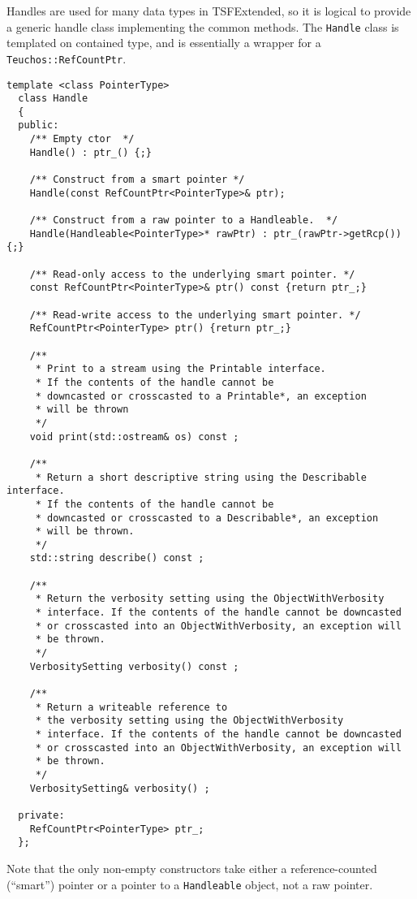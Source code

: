 Handles are used for many data types in TSFExtended, so it is logical to
provide a generic handle class implementing the common methods. The
{\tt Handle} class is templated on contained type, and is essentially
a wrapper for a {\tt Teuchos::RefCountPtr}. 
{\scriptsize\begin{verbatim}
template <class PointerType>
  class Handle
  {
  public: 
    /** Empty ctor  */
    Handle() : ptr_() {;}
    
    /** Construct from a smart pointer */
    Handle(const RefCountPtr<PointerType>& ptr);

    /** Construct from a raw pointer to a Handleable.  */
    Handle(Handleable<PointerType>* rawPtr) : ptr_(rawPtr->getRcp()) {;}

    /** Read-only access to the underlying smart pointer. */
    const RefCountPtr<PointerType>& ptr() const {return ptr_;}

    /** Read-write access to the underlying smart pointer. */
    RefCountPtr<PointerType> ptr() {return ptr_;}

    /** 
     * Print to a stream using the Printable interface. 
     * If the contents of the handle cannot be 
     * downcasted or crosscasted to a Printable*, an exception
     * will be thrown 
     */
    void print(std::ostream& os) const ;

    /** 
     * Return a short descriptive string using the Describable interface.
     * If the contents of the handle cannot be 
     * downcasted or crosscasted to a Describable*, an exception
     * will be thrown. 
     */
    std::string describe() const ;

    /** 
     * Return the verbosity setting using the ObjectWithVerbosity
     * interface. If the contents of the handle cannot be downcasted
     * or crosscasted into an ObjectWithVerbosity, an exception will
     * be thrown. 
     */
    VerbositySetting verbosity() const ;

    /** 
     * Return a writeable reference to 
     * the verbosity setting using the ObjectWithVerbosity
     * interface. If the contents of the handle cannot be downcasted
     * or crosscasted into an ObjectWithVerbosity, an exception will
     * be thrown. 
     */
    VerbositySetting& verbosity() ;

  private:
    RefCountPtr<PointerType> ptr_;
  };
\end{verbatim}}
Note that the only non-empty constructors take either a reference-counted (``smart'')
pointer or a pointer to a \verb+Handleable+ object, not a raw pointer. 
